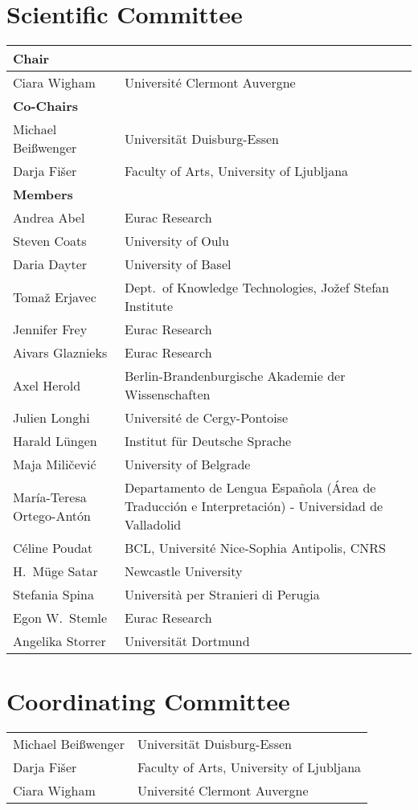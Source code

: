 \documentclass[usegeometry]{scrbook}
\begin{document}
\section*{Scientific Committee}
\begin{longtable}{p{}p{}} %
       \textbf{Chair} \\ \hline
    Ciara Wigham & Universit\'e Clermont Auvergne  %
       \medskip \\ \textbf{Co-Chairs} \\ \hline
    Michael Bei{\ss}wenger & Universit\"at Duisburg-Essen\\
    Darja Fi\v{s}er & Faculty of Arts, University of Ljubljana %
       \medskip\\ \textbf{Members} \\ \hline
    Andrea Abel & Eurac Research\\
    Steven Coats & University of Oulu\\
    Daria Dayter & University of Basel\\
    Toma\v{z} Erjavec & Dept.~of Knowledge Technologies, Jo\v{z}ef Stefan Institute\\
    Jennifer Frey & Eurac Research\\
    Aivars Glaznieks & Eurac Research\\
    Axel Herold & Berlin-Brandenburgische Akademie der Wissenschaften\\
    Julien Longhi & Universit\'e de Cergy-Pontoise\\
    Harald L\"ungen & Institut f\"ur Deutsche Sprache\\
    Maja Mili\v{c}evi\'c & University of Belgrade\\
    Mar\'ia-Teresa Ortego-Ant\'on & Departamento de Lengua Espa\~{n}ola (\'Area de Traducci\'on e Interpretaci\'on) - Universidad de Valladolid\\
    C\'eline Poudat & BCL, Universit\'e Nice-Sophia Antipolis, CNRS\\
    H.~M\"uge Satar & Newcastle University\\
    Stefania Spina & Universit\`a per Stranieri di Perugia\\
    Egon W.~Stemle & Eurac Research\\
    Angelika Storrer & Universit\"at Dortmund\\
\end{longtable}

\bigskip
\section*{Coordinating Committee}
\begin{longtable}{p{}p{}}
    Michael Bei{\ss}wenger & Universit\"at Duisburg-Essen\\
    Darja Fi\v{s}er & Faculty of Arts, University of Ljubljana\\
    Ciara Wigham & Universit\'e Clermont Auvergne\\
\end{longtable}
\end{document}
